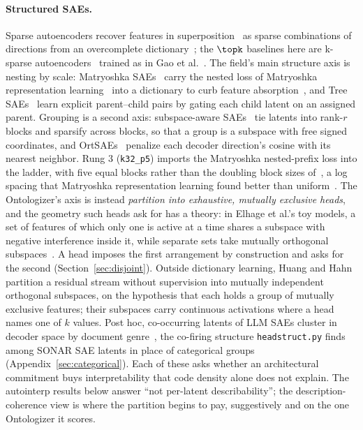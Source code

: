 \paragraph{Structured SAEs.}
Sparse autoencoders recover features in superposition~\cite{elhage2022}
as sparse combinations of directions from an overcomplete
dictionary~\cite{cunningham2023,bricken2023}; the $\topk$ baselines here
are k-sparse autoencoders~\cite{makhzani2014} trained as in Gao et
al.~\cite{gao2024}. The field's main structure axis is nesting by scale:
Matryoshka SAEs~\cite{bussmann2025} carry the nested loss of Matryoshka
representation learning~\cite{kusupati2022} into a dictionary to curb
feature absorption~\cite{chanin2025}, and Tree SAEs~\cite{cao2026} learn
explicit parent--child pairs by gating each child latent on an assigned
parent. Grouping is a second axis: subspace-aware SAEs~\cite{dalili2026}
tie latents into rank-$r$ blocks and sparsify across blocks, so that a
group is a subspace with free signed coordinates, and
OrtSAEs~\cite{korznikov2025} penalize each decoder direction's cosine with
its nearest neighbor. Rung 3 (\texttt{k32\_p5}) imports the Matryoshka
nested-prefix loss into the ladder, with five equal blocks rather than the
doubling block sizes of~\cite{bussmann2025}, a log spacing that Matryoshka
representation learning found better than uniform~\cite{kusupati2022}.
The Ontologizer's axis is instead \emph{partition into exhaustive,
mutually exclusive heads}, and the geometry such heads ask for has a
theory: in Elhage et al.'s toy models, a set of features of which only one
is active at a time shares a subspace with negative interference inside
it, while separate sets take mutually orthogonal
subspaces~\cite{elhage2022}. A head imposes the first arrangement by
construction and asks for the second (Section~\ref{sec:disjoint}).
Outside dictionary learning, Huang and Hahn~\cite{huang2025decomposing}
partition a residual stream without supervision into mutually independent
orthogonal subspaces, on the hypothesis that each holds a group of
mutually exclusive features; their subspaces carry continuous activations
where a head names one of $k$ values. Post hoc, co-occurring latents of
LLM SAEs cluster in decoder space by document genre~\cite{li2024geometry},
the co-firing structure \texttt{headstruct.py} finds among SONAR SAE
latents in place of categorical groups (Appendix~\ref{sec:categorical}).
Each of these asks whether an architectural commitment buys
interpretability that code density alone does not explain. The autointerp
results below answer ``not per-latent describability''; the
description-coherence view is where the partition begins to pay,
suggestively and on the one Ontologizer it scores.

